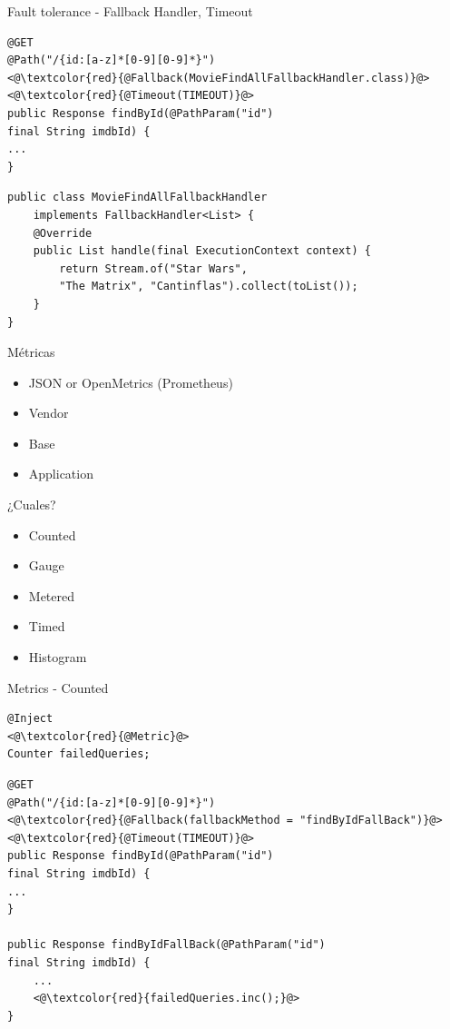 \documentclass[aspectratio=169]{beamer}
\begin{document}
\begin{frame}[fragile]{Fault tolerance - Fallback Handler, Timeout}
\begin{lstlisting}
@GET
@Path("/{id:[a-z]*[0-9][0-9]*}")
<@\textcolor{red}{@Fallback(MovieFindAllFallbackHandler.class)}@>
<@\textcolor{red}{@Timeout(TIMEOUT)}@>
public Response findById(@PathParam("id")
final String imdbId) {
...
}
\end{lstlisting}
\begin{lstlisting}
public class MovieFindAllFallbackHandler
	implements FallbackHandler<List> {
	@Override
	public List handle(final ExecutionContext context) {
		return Stream.of("Star Wars",
		"The Matrix", "Cantinflas").collect(toList());
	}
}
\end{lstlisting}
\end{frame}


\begin{frame}{Métricas}

\begin{itemize}
	\item JSON or OpenMetrics (Prometheus)
	\item Vendor
	\item Base
	\item Application
\end{itemize}

¿Cuales?
\begin{itemize}
	\item Counted
	\item Gauge
	\item Metered
	\item Timed
	\item Histogram
\end{itemize}

\end{frame}

\begin{frame}[fragile]{Metrics - Counted}
\begin{lstlisting}
@Inject
<@\textcolor{red}{@Metric}@>
Counter failedQueries;
\end{lstlisting}

\begin{lstlisting}
@GET
@Path("/{id:[a-z]*[0-9][0-9]*}")
<@\textcolor{red}{@Fallback(fallbackMethod = "findByIdFallBack")}@>
<@\textcolor{red}{@Timeout(TIMEOUT)}@>
public Response findById(@PathParam("id")
final String imdbId) {
...
}

public Response findByIdFallBack(@PathParam("id")
final String imdbId) {
	...
	<@\textcolor{red}{failedQueries.inc();}@>
}
\end{lstlisting}
\end{frame}
\end{document}
